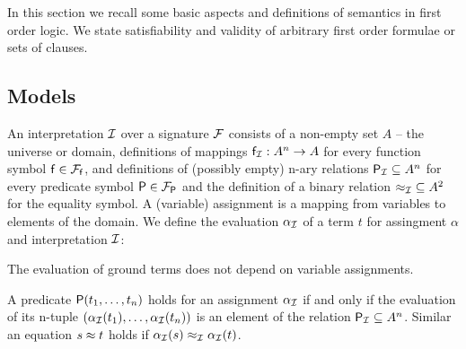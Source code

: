In this section we recall some basic aspects and definitions of semantics in first order logic. 
We state satisfiability and validity of arbitrary first order formulae or sets of clauses. 

\subsection{Models}

\begin{definition}\label{def:interpretation}
	An {\myem interpretation} ${\mathcal I}$ over a signature ${\mathcal F}$ consists of a
	non-empty set $A$ -- the {\myem universe} or {\myem domain},
	definitions of mappings ${\mathsf f}_{\mathcal I}: A^n\rightarrow A$ for every function symbol ${\mathsf f}\in{{\mathcal F}_{\mathsf f}}$, 
	and definitions of (possibly empty) n-ary relations 
	 ${{\mathsf P}_{\mathcal I}}\subseteq A^n$ for every predicate symbol ${\mathsf P}\in{{\mathcal F}_{\mathsf P}}$
	 and the definition of a binary relation ${\approx_{\mathcal I}}\subseteq A^2$ for the equality symbol.
	 A (variable) {\myem assignment} is a mapping from variables to elements of the domain.
	 We define the {\myem evaluation} $\alpha_{\mathcal I}$ of a term $t$ 
	 for assingment $\alpha$ and interpretation ${\mathcal I}$:
\begin{remark}
	The evaluation of ground terms does not depend on variable assignments.
\end{remark}
\end{definition}

\begin{definition}\label{def:semantics:atoms}
	A predicate ${\mathsf P}(t_1,\ldots,t_n)$ 
	{\myem holds} for an assignment $\alpha_{\mathcal I}$ 
	if and only if the evaluation of its n-tuple $
	(\alpha_{\mathcal I}({t_1}),\ldots,\alpha_{\mathcal I}({t_n}))$
	is an element of the relation ${\mathsf P}_{\mathcal I}\subseteq A^n$.
	Similar an equation $s\approx t$ 
	holds if $\alpha_{\mathcal I}(s) \approx_{\mathcal I} \alpha_{\mathcal I}(t)$.
\end{definition}

